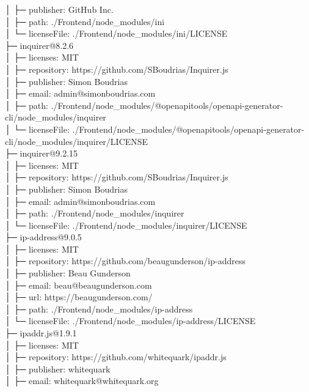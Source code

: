 \documentclass[
    paper=a4,
    twoside=false,
    parskip=half,
    listof=entryprefix,
    listof=totoc,
    index=totoc,
    bibliography=totoc,
    headsepline,
]{scrbook}
\begin{document}
    │  ├─ publisher: GitHub Inc.\\
    │  ├─ path: ./Frontend/node\_modules/ini\\
    │  └─ licenseFile: ./Frontend/node\_modules/ini/LICENSE\\
    ├─ inquirer@8.2.6\\
    │  ├─ licenses: MIT\\
    │  ├─ repository: https://github.com/SBoudrias/Inquirer.js\\
    │  ├─ publisher: Simon Boudrias\\
    │  ├─ email: admin@simonboudrias.com\\
    │  ├─ path: ./Frontend/node\_modules/@openapitools/openapi-generator-cli/node\_modules/inquirer\\
    │  └─ licenseFile: ./Frontend/node\_modules/@openapitools/openapi-generator-cli/node\_modules/inquirer/LICENSE\\
    ├─ inquirer@9.2.15\\
    │  ├─ licenses: MIT\\
    │  ├─ repository: https://github.com/SBoudrias/Inquirer.js\\
    │  ├─ publisher: Simon Boudrias\\
    │  ├─ email: admin@simonboudrias.com\\
    │  ├─ path: ./Frontend/node\_modules/inquirer\\
    │  └─ licenseFile: ./Frontend/node\_modules/inquirer/LICENSE\\
    ├─ ip-address@9.0.5\\
    │  ├─ licenses: MIT\\
    │  ├─ repository: https://github.com/beaugunderson/ip-address\\
    │  ├─ publisher: Beau Gunderson\\
    │  ├─ email: beau@beaugunderson.com\\
    │  ├─ url: https://beaugunderson.com/\\
    │  ├─ path: ./Frontend/node\_modules/ip-address\\
    │  └─ licenseFile: ./Frontend/node\_modules/ip-address/LICENSE\\
    ├─ ipaddr.js@1.9.1\\
    │  ├─ licenses: MIT\\
    │  ├─ repository: https://github.com/whitequark/ipaddr.js\\
    │  ├─ publisher: whitequark\\
    │  ├─ email: whitequark@whitequark.org\\
\end{document}
